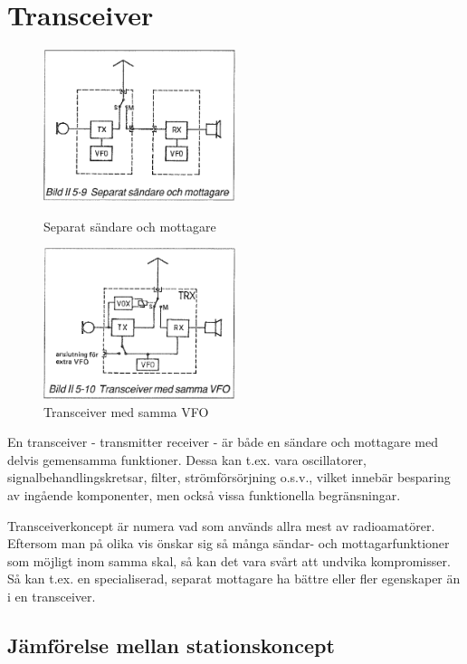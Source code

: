 \section{Transceiver}

\begin{figure}
  \includegraphics[width=0.5\textwidth]{images/bild_2_5-09}
  \caption{Separat sändare och mottagare}
  \label{fig:bildII5-9}

  \includegraphics[width=0.5\textwidth]{images/bild_2_5-10}
  \caption{Transceiver med samma VFO}
  \label{fig:bildII5-10}
\end{figure}

En transceiver - transmitter receiver - är både en sändare och
mottagare med delvis gemensamma funktioner. Dessa kan t.ex.  vara
oscillatorer, signalbehandlingskretsar, filter, strömförsörjning
o.s.v., vilket innebär besparing av ingående komponenter, men också
vissa funktionella begränsningar.

Transceiverkoncept är numera vad som används allra mest av
radioamatörer. Eftersom man på olika vis önskar sig så många sändar-
och mottagarfunktioner som möjligt inom samma skal, så kan det vara
svårt att undvika kompromisser. Så kan t.ex. en specialiserad, separat
mottagare ha bättre eller fler egenskaper än i en transceiver.

\subsection{Jämförelse mellan stationskoncept}

